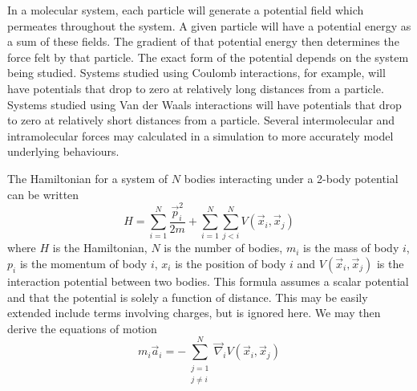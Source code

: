 %
In a molecular system, each particle will generate a potential field
which permeates throughout the system.
%
A given particle will have a potential energy as a sum of these fields.
%
The gradient of that potential energy then determines
the force felt by that particle.
%
The exact form of the potential depends on the system being studied.
%
Systems studied using Coulomb interactions, for example,
will have potentials that drop to zero at relatively long distances
from a particle.
%
Systems studied using Van der Waals interactions will have
potentials that drop to zero at relatively short distances from
a particle.
%
Several intermolecular and intramolecular forces may
calculated in a simulation to more accurately model underlying behaviours.


%
The Hamiltonian for a system of $N$ bodies
interacting under a 2-body potential can be written
\begin{equation}
    H = \sum_{i=1}^N \frac{\vec{p}_i^2}{2 m}
        + \sum_{i=1}^N \sum_{j<i}^N V(\vec{x}_i, \vec{x}_j)
\end  {equation}
where $H$ is the Hamiltonian,
$N$ is the number of bodies,
$m_i$ is the mass of body $i$,
$p_i$ is the momentum of body $i$,
$x_i$ is the position of body $i$ and
$V(\vec{x}_i, \vec{x}_j)$ is the interaction potential between two bodies.
This formula assumes a scalar potential and
that the potential is solely a function of distance.
%
This may be easily extended include terms involving charges,
but is ignored here.
%
We may then derive the equations of motion
\begin{equation}
    m_i \vec{a}_i = -\sum_{\substack{j=1\\j\ne{}i}}^N
                    \vec{\nabla}_i V(\vec{x}_i, \vec{x}_j)
\end  {equation}


